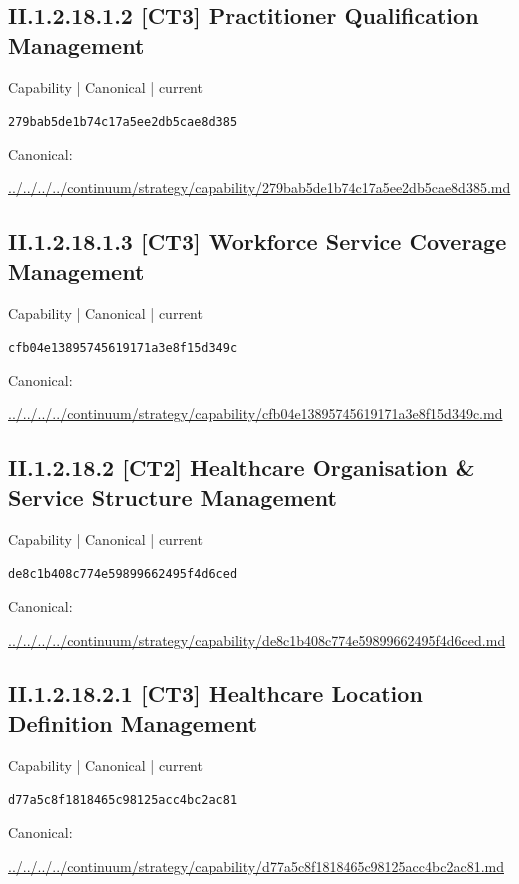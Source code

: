 \documentclass[10pt,a4paper]{article}
\begin{document}
\subsection*{II.1.2.18.1.2 [CT3] Practitioner Qualification Management}
\label{element-279bab5de1b74c17a5ee2db5cae8d385}
{\small Capability | Canonical | current}\par
\texttt{279bab5de1b74c17a5ee2db5cae8d385}\par
Canonical: \par
{\footnotesize\url{../../../../continuum/strategy/capability/279bab5de1b74c17a5ee2db5cae8d385.md}}\par
\subsection*{II.1.2.18.1.3 [CT3] Workforce Service Coverage Management}
\label{element-cfb04e13895745619171a3e8f15d349c}
{\small Capability | Canonical | current}\par
\texttt{cfb04e13895745619171a3e8f15d349c}\par
Canonical: \par
{\footnotesize\url{../../../../continuum/strategy/capability/cfb04e13895745619171a3e8f15d349c.md}}\par
\subsection*{II.1.2.18.2 [CT2] Healthcare Organisation \& Service Structure Management}
\label{element-de8c1b408c774e59899662495f4d6ced}
{\small Capability | Canonical | current}\par
\texttt{de8c1b408c774e59899662495f4d6ced}\par
Canonical: \par
{\footnotesize\url{../../../../continuum/strategy/capability/de8c1b408c774e59899662495f4d6ced.md}}\par
\subsection*{II.1.2.18.2.1 [CT3] Healthcare Location Definition Management}
\label{element-d77a5c8f1818465c98125acc4bc2ac81}
{\small Capability | Canonical | current}\par
\texttt{d77a5c8f1818465c98125acc4bc2ac81}\par
Canonical: \par
{\footnotesize\url{../../../../continuum/strategy/capability/d77a5c8f1818465c98125acc4bc2ac81.md}}\par
\end{document}
